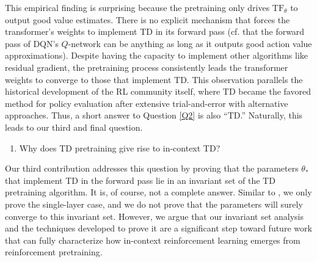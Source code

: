 \documentclass{article}
\newcommand{\tf}{\text{TF}}
\begin{document}
This empirical finding is surprising because the pretraining only drives $\tf_\theta$ to output good value estimates.
There is no explicit mechanism that forces the transformer's weights to
implement TD in its forward pass (cf. that the forward pass of DQN's $Q$-network can be anything as long as it outputs good action value approximations).
Despite having the capacity to implement other algorithms like residual gradient, the pretraining process consistently leads the transformer weights to converge to those that implement TD.
This observation parallels the historical development of the RL community itself, where TD became the favored method for policy evaluation after extensive trial-and-error with alternative approaches.
Thus, a short answer to Question \ref{Q2} is also ``TD.''
Naturally, this leads to our third and final question.
\begin{enumerate}[topsep=0pt,itemsep=-1ex,partopsep=1ex,parsep=1ex, start=3, label={ (Q\arabic*)}]
    \item Why does TD pretraining give rise to in-context TD? \label{Q3}
\end{enumerate}
Our third contribution addresses this question by proving that the parameters $\theta_*$ that implement TD in the forward pass lie in an invariant set of the TD pretraining algorithm.
It is, of course, not a complete answer.
Similar to \citet{wu2023many,zhang2024trained}, we only prove the single-layer case, and we do not prove that the parameters will surely converge to this invariant set.
However, we argue that our invariant set analysis and the techniques developed to prove it are a significant step toward future work that can fully characterize how in-context reinforcement learning emerges from reinforcement pretraining.
\end{document}
